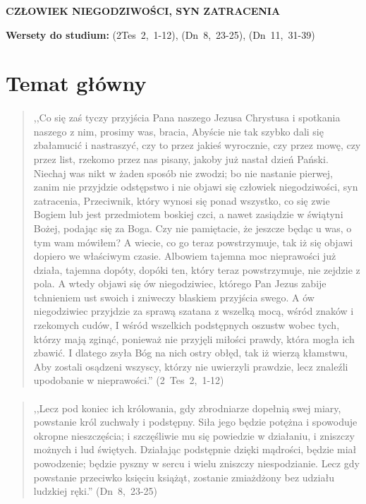 \documentclass[10pt,a4paper,oneside]{article}
\begin{document}
\centerline{\textbf{\MakeUppercase{Człowiek niegodziwości, syn zatracenia}}}
\begin{center}
\textbf{Wersety do studium:} \mbox{(2Tes 2, 1-12)}, \mbox{(Dn 8, 23-25)}, \mbox{(Dn 11, 31-39)}
\end{center}
\section{Temat główny}
\paragraph{}
\begin{quote}
,,Co się zaś tyczy przyjścia Pana naszego Jezusa Chrystusa i spotkania naszego z nim, prosimy was, bracia, Abyście nie tak szybko dali się zbałamucić i nastraszyć, czy to przez jakieś wyrocznie, czy przez mowę, czy przez list, rzekomo przez nas pisany, jakoby już nastał dzień Pański. Niechaj was nikt w żaden sposób nie zwodzi; bo nie nastanie pierwej, zanim nie przyjdzie odstępstwo i nie objawi się człowiek niegodziwości, syn zatracenia, Przeciwnik, który wynosi się ponad wszystko, co się zwie Bogiem lub jest przedmiotem boskiej czci, a nawet zasiądzie w świątyni Bożej, podając się za Boga. Czy nie pamiętacie, że jeszcze będąc u was, o tym wam mówiłem? A wiecie, co go teraz powstrzymuje, tak iż się objawi dopiero we właściwym czasie. Albowiem tajemna moc nieprawości już działa, tajemna dopóty, dopóki ten, który teraz powstrzymuje, nie zejdzie z pola. A wtedy objawi się ów niegodziwiec, którego Pan Jezus zabije tchnieniem ust swoich i zniweczy blaskiem przyjścia swego. A ów niegodziwiec przyjdzie za sprawą szatana z wszelką mocą, wśród znaków i rzekomych cudów, I wśród wszelkich podstępnych oszustw wobec tych, którzy mają zginąć, ponieważ nie przyjęli miłości prawdy, która mogła ich zbawić. I dlatego zsyła Bóg na nich ostry obłęd, tak iż wierzą kłamstwu, Aby zostali osądzeni wszyscy, którzy nie uwierzyli prawdzie, lecz znaleźli upodobanie w nieprawości.'' \mbox{(2 Tes 2, 1-12)}
\end{quote}
\paragraph{}
\begin{quote}
,,Lecz pod koniec ich królowania, gdy zbrodniarze dopełnią swej miary, powstanie król zuchwały i podstępny. Siła jego będzie potężna i spowoduje okropne nieszczęścia; i szczęśliwie mu się powiedzie w działaniu, i zniszczy możnych i lud świętych. Działając podstępnie dzięki mądrości, będzie miał powodzenie; będzie pyszny w sercu i wielu zniszczy niespodzianie. Lecz gdy powstanie przeciwko księciu książąt, zostanie zmiażdżony bez udziału ludzkiej ręki.'' \mbox{(Dn 8, 23-25)}
\end{quote}
\end{document}

